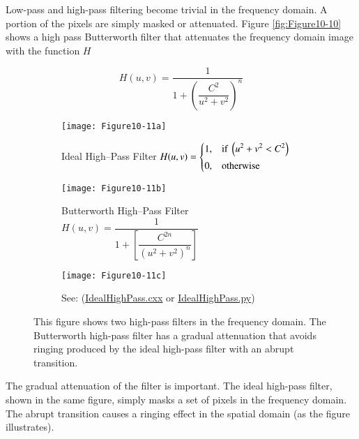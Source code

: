 Low-pass and high-pass filtering become trivial in the frequency domain. A portion of the pixels are simply masked or attenuated. Figure \ref{fig:Figure10-10} shows a high pass Butterworth filter that attenuates the frequency domain image with the function $H$

\begin{equation}\label{eq:10.2}
H(u, v) = \dfrac{1}{1 + \left(\dfrac{C^2}{u^2 + v^2}\right)^n}
\end{equation}

\begin{figure}[htb]
    \begin{subfigure}[h]{0.48\linewidth}
        \texttt{[image: Figure10-11a]}
        \captionsetup{justification=centering}
        \caption*{Ideal High--Pass Filter $H(u,v) = \begin{dcases}
        1, & \text{if } \left( u^2 + v^2 < C^2 \right) \\
        0, & \text{otherwise}
        \end{dcases}$}
        \label{fig:Figure10-11a}
    \end{subfigure}
    \hfill
    \begin{subfigure}[h]{0.48\linewidth}
        \texttt{[image: Figure10-11b]}
        \captionsetup{justification=centering}
        \caption*{Butterworth High--Pass Filter
        $H(u,v) = \dfrac{1} {1 + \left[ \dfrac{C^{2n}}{\left( u^2 + v ^2\right)^n} \right]} $}
        \label{fig:Figure10-11b}
    \end{subfigure}
    \hfill
    \begin{subfigure}[h]{0.96\linewidth}
        \texttt{[image: Figure10-11c]}
        \captionsetup{justification=centering}
        \caption*{See: (\href{https://lorensen.github.io/VTKExamples/site/Cxx/ImageProcessing/IdealHighPass/}{IdealHighPass.cxx} or \href{https://lorensen.github.io/VTKExamples/site/Python/ImageProcessing/IdealHighPass/}{IdealHighPass.py})}
        \label{fig:Figure10-11c}
    \end{subfigure}
    \caption{This figure shows two high-pass filters in the frequency domain. The Butterworth high-pass filter has a gradual attenuation that avoids ringing produced by the ideal high-pass filter with an abrupt transition.}\label{fig:Figure10-11}
\end{figure}

The gradual attenuation of the filter is important. The ideal high-pass filter, shown in the same figure, simply masks a set of pixels in the frequency domain. The abrupt transition causes a ringing effect in the spatial domain (as the figure illustrates).


